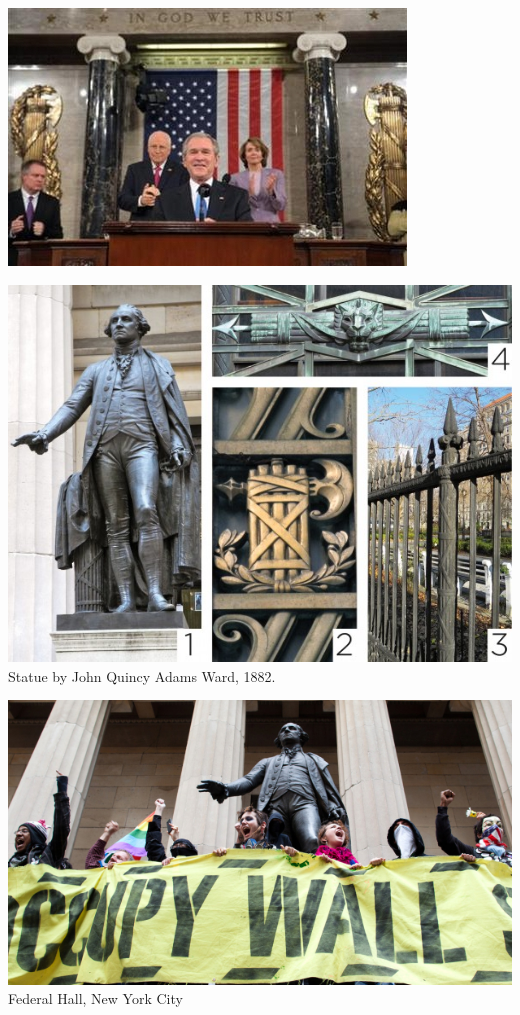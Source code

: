 \begin{frame}
    \centering
    \includegraphics[width=.9\textwidth]{img/fasces/fasces_congress.jpg} \\
\end{frame}
\begin{frame}
    \centering
    \includegraphics[width=.9\textwidth]{img/fasces/fasces-stuff.jpg} \\
    Statue by John Quincy Adams Ward, 1882.
\end{frame}
\begin{frame}
    \centering
    \includegraphics[width=.9\textwidth]{img/fasces/ows.jpg} \\
    Federal Hall, New York City \\
\end{frame}
